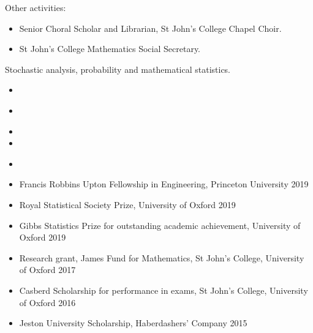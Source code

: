 \documentclass[
  date,
  number,
]{wgu-cv}
\begin{document}
Other activities:

\begin{itemize}
	\item Senior Choral Scholar and Librarian,
    St John's College Chapel Choir.
	\item St John's College Mathematics Social Secretary.
\end{itemize}



Stochastic analysis, probability and mathematical statistics.



\begin{itemize}
	\item {}
\end{itemize}

\begin{itemize}
\item {}
\end{itemize}

\begin{itemize}
  \item {}
  \item {}
\end{itemize}


\begin{itemize}
  \item {}
\end{itemize}



\begin{itemize}
  \item Francis Robbins Upton Fellowship in Engineering,
    Princeton University
    \hfill 2019%
  \item Royal Statistical Society Prize,
    University of Oxford
    \hfill 2019%
  \item Gibbs Statistics Prize for outstanding academic achievement,
    University of Oxford
    \hfill 2019%
	\item Research grant, James Fund for Mathematics,
    St John's College, University of Oxford
    \hfill 2017%
	\item Casberd Scholarship for performance in exams,
    St John's College, University of Oxford
    \hfill 2016%
  \item Jeston University Scholarship,
    Haberdashers' Company
    \hfill 2015%
\end{itemize}
\end{document}
